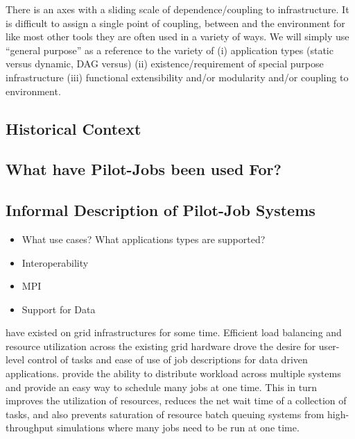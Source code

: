 \documentclass{sig-alternate}
\begin{document}


There is an axes with a sliding scale of dependence/coupling to
infrastructure.  It is difficult to assign a single point of coupling,
between \pilotjobs and the environment for like most other tools they
are often used in a variety of ways.  We will simply use ``general
purpose'' as a reference to the variety of (i) application types
(static versus dynamic, DAG versus) (ii) existence/requirement of
special purpose infrastructure (iii) functional extensibility and/or
modularity and/or coupling to environment.

\subsection{Historical Context}
\subsection{What have Pilot-Jobs been used For?}

\subsection{Informal Description of Pilot-Job Systems}


\begin{itemize}
	\item What use cases? What applications types are supported?
	\item Interoperability
	\item MPI 
	\item Support for Data
\end{itemize}

\pilotjobs have existed on grid infrastructures for some time. 
Efficient load balancing and resource utilization
across the existing grid hardware drove the desire for 
user-level control of tasks and ease of use of job descriptions for
data driven applications.  \pilotjobs provide the ability to 
distribute workload across multiple systems and
provide an easy way to schedule many jobs at one time. This in turn
improves the utilization of resources, reduces the net wait time of a
collection of tasks, and also prevents saturation of resource batch
queuing systems from high-throughput simulations where many jobs
need to be run at one time.
\end{document}
